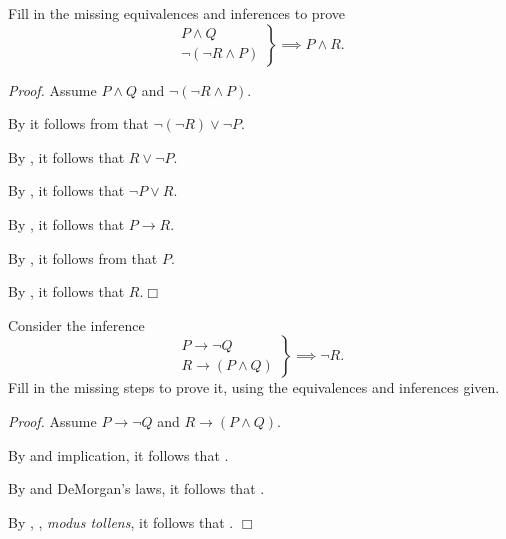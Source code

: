 \begin{exer}[\exerU] %
\label{exer_proof_infer_random}
    Fill in the missing equivalences and inferences to prove 
        $$\left. \begin{array} {cc} P \land Q  \\ \neg(\neg R \land P) \end{array} \right\} \implies P \land R.$$

        \emph{Proof.}  Assume  $ P\land Q$ and  $\neg(\neg R \land P)$. 
        
        By \underline{\hspace{.75 in}} it follows from  that $\neg (\neg R) \lor \neg P$.  

        By \underline{\hspace{.75 in}}, it follows that $R \lor \neg P$.  

        By \underline{\hspace{.75 in}}, it follows that $ \neg P \lor R$.  

        By \underline{\hspace{.75 in}}, it follows that $ P \to R$.  

        By \underline{\hspace{.75 in}}, it follows from  that $P$. 

        By \underline{\hspace{.75 in}}, it follows that $R$.\hfill $\Box$
\end{exer}

\begin{exer}[\exerU] %
\label{exer_proof_infer_random2}
    Consider the inference  
        $$\left. \begin{array} {cc} P \to \neg Q  \\ R \to (P \land Q)\end{array} \right\} \implies \neg R.$$  Fill in the missing steps to prove it, using the equivalences and inferences given.
            
            \emph{Proof.} Assume  $P \to \neg Q$ and  $R \to (P \land Q)$. 
            
            By  and implication, it follows that  \underline{\hspace{.75 in}}.
            
            By  and DeMorgan's laws, it follows that \underline{\hspace{.75 in}}.
            
            By , , \emph{modus tollens}, it follows that \underline{\hspace{.75 in}}. \hfill $\Box$   
\end{exer}

